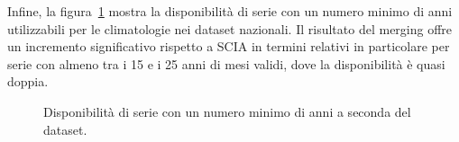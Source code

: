 Infine, la figura~\ref{fig:merged-improvements} mostra la disponibilità di serie con un numero minimo di anni utilizzabili per le climatologie nei dataset nazionali. Il risultato del merging offre un incremento significativo rispetto a SCIA in termini relativi in particolare per serie con almeno tra i 15 e i 25 anni di mesi validi, dove la disponibilità è quasi doppia.
\begin{figure}[ht]
  \centering
  
  \caption{Disponibilità di serie con un numero minimo di anni a seconda del dataset.}\label{fig:merged-improvements}
\end{figure}
